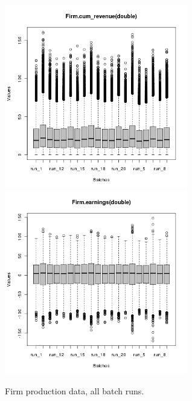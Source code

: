 \begin{figure}[H!]
\centering\leavevmode
\begin{minipage}{17cm}
\centering\leavevmode
\includegraphics[width=8cm]{./benchmark_plots/Firm-cum_revenue-batches.png}
\includegraphics[width=8cm]{./benchmark_plots/Firm-earnings-batches.png}
\end{minipage}
\caption{Firm production data, all batch runs.}
\label{Figure: Firm Production batch}
\end{figure}
\clearpage


